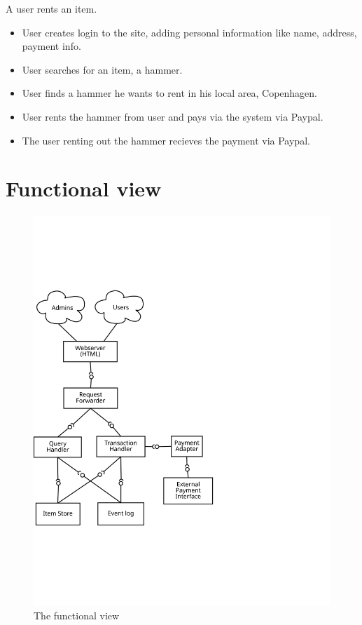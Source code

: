 \documentclass[a4paper,11pt]{report}
\begin{document}
A user rents an item.
\begin{itemize}
  \item User creates login to the site, adding personal information like name, address, payment info.
  \item User searches for an item, a hammer.
  \item User finds a hammer he wants to rent in his local area, Copenhagen.
  \item User rents the hammer from user and pays via the system via Paypal.
  \item The user renting out the hammer recieves the payment via Paypal.
\end{itemize}

\section{Functional view}
\label{sec:functional-view}

\begin{figure}
\label{fig:funcView}
\centering
\caption{The functional view}
\includegraphics[width=\textwidth]{figures/functional-view}
\end{figure}
\end{document}
